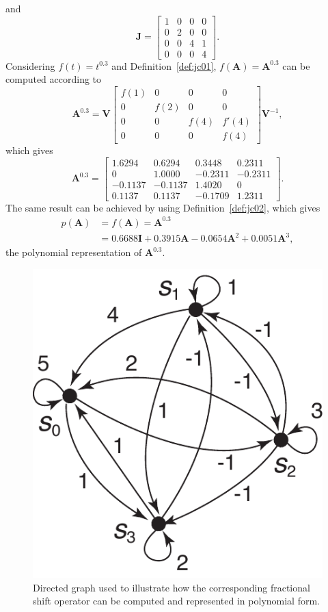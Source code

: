 and
\begin{equation}
\mathbf{J}=\left[\begin{array}{ccccc}
1&0&0&0\\
0&2&0&0\\
0&0&4&1\\
0&0&0&4
\end{array}\right].
\end{equation}
Considering $f(t)=t^{0.3}$ and Definition~\ref{def:jc01}, $f(\mathbf{A})=\mathbf{A}^{0.3}$ can be computed according to
\begin{equation}\nonumber
\mathbf{A}^{0.3}=\mathbf{V}
\left[\begin{array}{ccccc}
f(1)&0&0&0\\
0&f(2)&0&0\\
0&0&f(4)&f'(4)\\
0&0&0&f(4)
\end{array}\right]\mathbf{V}^{-1},
\end{equation}
which gives
\begin{equation}\nonumber
\mathbf{A}^{0.3}=
\left[\begin{array}{ccccc}
    1.6294  &  0.6294 &   0.3448 &   0.2311\\
         0  &  1.0000 &  -0.2311 &  -0.2311\\
   -0.1137 &  -0.1137  &  1.4020     &    0\\
    0.1137  &  0.1137  & -0.1709  &  1.2311
\end{array}\right].
\end{equation}
The same result can be achieved by using Definition~\ref{def:jc02}, which gives
\begin{align}
    p(\mathbf{A})&=f(\mathbf{A})=\mathbf{A}^{0.3}\nonumber\\
    &=0.6688\mathbf{I}+0.3915\mathbf{A}-0.0654\mathbf{A}^2+0.0051\mathbf{A}^3,\nonumber
\end{align}
the polynomial representation of $\mathbf{A}^{0.3}$.

\begin{figure}
	\centering
	\includegraphics[width=0.35\linewidth]{Figures/graph_jordan.pdf}
	\caption{Directed graph used to illustrate how the corresponding fractional shift operator can be computed and represented in polynomial form.}
	\label{fig:polyrepres}
\end{figure}

